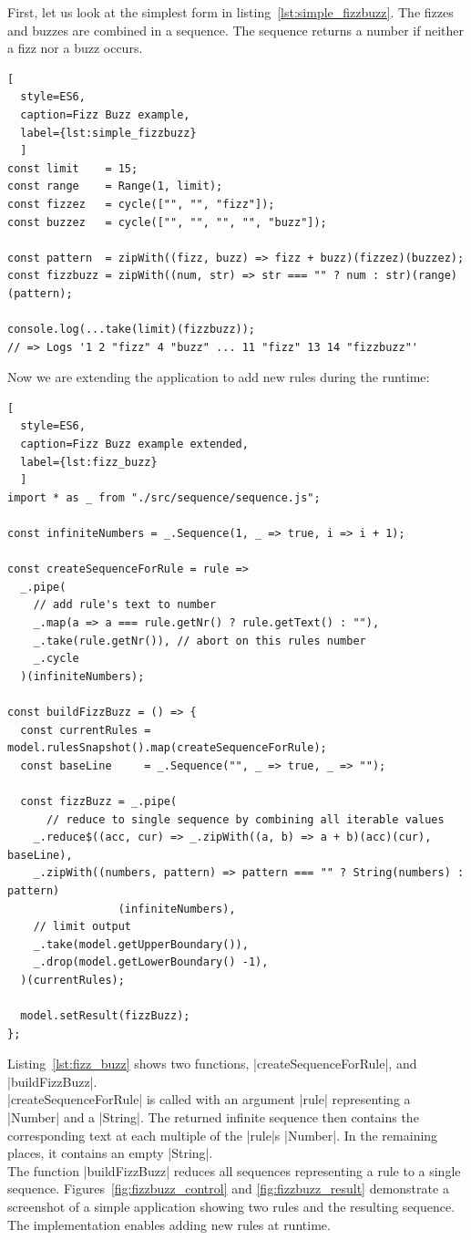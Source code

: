 First, let us look at the simplest form in listing~\ref{lst:simple_fizzbuzz}. 
The fizzes and buzzes are combined in a
sequence. 
The sequence returns a number if neither a fizz nor a buzz occurs.

\begin{lstlisting}[
  style=ES6, 
  caption=Fizz Buzz example,
  label={lst:simple_fizzbuzz}
  ]
const limit    = 15;
const range    = Range(1, limit);
const fizzez   = cycle(["", "", "fizz"]);
const buzzez   = cycle(["", "", "", "", "buzz"]);

const pattern  = zipWith((fizz, buzz) => fizz + buzz)(fizzez)(buzzez);
const fizzbuzz = zipWith((num, str) => str === "" ? num : str)(range)(pattern);

console.log(...take(limit)(fizzbuzz));
// => Logs '1 2 "fizz" 4 "buzz" ... 11 "fizz" 13 14 "fizzbuzz"'
\end{lstlisting}

Now we are extending the application to add new rules during the runtime:

\begin{lstlisting}[
  style=ES6, 
  caption=Fizz Buzz example extended,
  label={lst:fizz_buzz}
  ]
import * as _ from "./src/sequence/sequence.js";

const infiniteNumbers = _.Sequence(1, _ => true, i => i + 1);

const createSequenceForRule = rule =>
  _.pipe(
    // add rule's text to number
    _.map(a => a === rule.getNr() ? rule.getText() : ""),     
    _.take(rule.getNr()), // abort on this rules number
    _.cycle
  )(infiniteNumbers);

const buildFizzBuzz = () => {
  const currentRules = model.rulesSnapshot().map(createSequenceForRule);
  const baseLine     = _.Sequence("", _ => true, _ => "");

  const fizzBuzz = _.pipe(
      // reduce to single sequence by combining all iterable values
    _.reduce$((acc, cur) => _.zipWith((a, b) => a + b)(acc)(cur), baseLine), 
    _.zipWith((numbers, pattern) => pattern === "" ? String(numbers) : pattern)
                 (infiniteNumbers), 
    // limit output
    _.take(model.getUpperBoundary()),
    _.drop(model.getLowerBoundary() -1),
  )(currentRules);

  model.setResult(fizzBuzz);
};
\end{lstlisting}
Listing~\ref{lst:fizz_buzz} shows two functions, |createSequenceForRule|, and
|buildFizzBuzz|. \\ 
|createSequenceForRule| is called with an argument |rule| representing a
|Number| and a |String|. The returned infinite sequence then contains the
corresponding text at each multiple of the |rule|s |Number|. In the remaining
places, it contains an empty |String|. \\ 
The function |buildFizzBuzz| reduces all sequences representing a rule to a
single sequence. 
Figures~\ref{fig:fizzbuzz_control} and \ref{fig:fizzbuzz_result} demonstrate a
screenshot of a simple application showing two rules and the resulting sequence.
The implementation enables adding new rules at runtime. 

